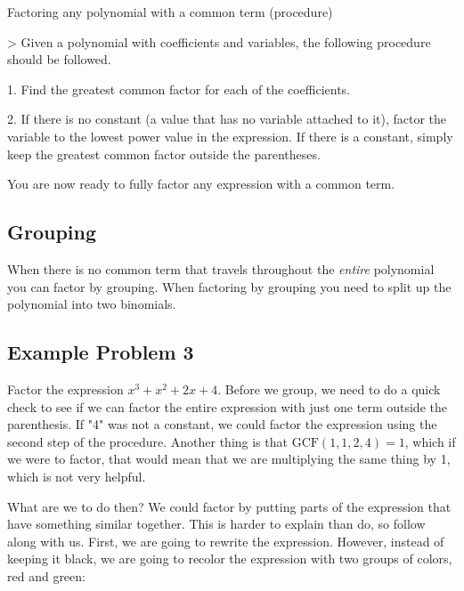 Factoring any polynomial with a common term (procedure)



> Given a polynomial with coefficients and variables, the following procedure should be followed.

    1.  Find the greatest common factor for each of the coefficients.

    2.  If there is no constant (a value that has no variable attached to it), factor the
    variable to the lowest power value in the expression. If there is a constant, simply
    keep the greatest common factor outside the parentheses.



You are now ready to fully factor any expression with a common term.




\subsection{Grouping}
\label{sss:grou-a0d9}




When there is no common term that travels throughout the \textit{entire} polynomial you
can factor by grouping. When factoring by grouping you need to split up the polynomial
into two binomials.




\subsection{Example Problem 3}
\label{sss:exam-a50a}




Factor the expression $x^3+x^2+2x+4$. Before we group, we need to do a quick check to see
if we can factor the entire expression with just one term outside the parenthesis. If "4"
was not a constant, we could factor the expression using the second step of the procedure.
Another thing is that $\text{GCF}\left(1,1,2,4\right)=1$, which if we were to factor, that
would mean that we are multiplying the same thing by 1, which is not very helpful.



What are we to do then? We could factor by putting parts of the expression that have
something similar together. This is harder to explain than do, so follow along with us.
First, we are going to rewrite the expression. However, instead of keeping it black, we
are going to recolor the expression with two groups of colors, red and green:

